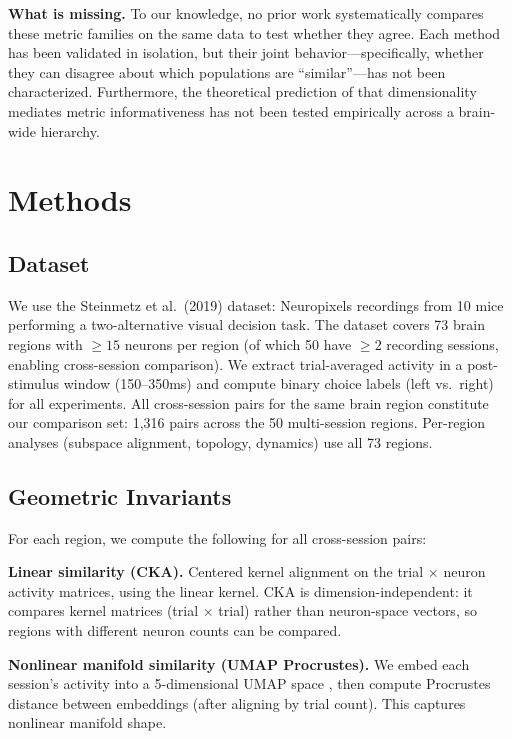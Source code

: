 \documentclass{article}
\begin{document}
\textbf{What is missing.} To our knowledge, no prior work systematically compares these metric families on the same data to test whether they agree. Each method has been validated in isolation, but their joint behavior---specifically, whether they can disagree about which populations are ``similar''---has not been characterized. Furthermore, the theoretical prediction of \citet{harvey2024representational} that dimensionality mediates metric informativeness has not been tested empirically across a brain-wide hierarchy.

\section{Methods}

\subsection{Dataset}

We use the Steinmetz et al.\ (2019) dataset: Neuropixels recordings from 10 mice performing a two-alternative visual decision task. The dataset covers 73 brain regions with $\geq 15$ neurons per region (of which 50 have $\geq 2$ recording sessions, enabling cross-session comparison). We extract trial-averaged activity in a post-stimulus window (150--350ms) and compute binary choice labels (left vs.\ right) for all experiments. All cross-session pairs for the same brain region constitute our comparison set: 1,316 pairs across the 50 multi-session regions. Per-region analyses (subspace alignment, topology, dynamics) use all 73 regions.

\subsection{Geometric Invariants}

For each region, we compute the following for all cross-session pairs:

\textbf{Linear similarity (CKA).} Centered kernel alignment \citep{kornblith2019similarity} on the trial $\times$ neuron activity matrices, using the linear kernel. CKA is dimension-independent: it compares kernel matrices (trial $\times$ trial) rather than neuron-space vectors, so regions with different neuron counts can be compared.

\textbf{Nonlinear manifold similarity (UMAP Procrustes).} We embed each session's activity into a 5-dimensional UMAP space \citep{mcinnes2018umap}, then compute Procrustes distance between embeddings (after aligning by trial count). This captures nonlinear manifold shape.
\end{document}
